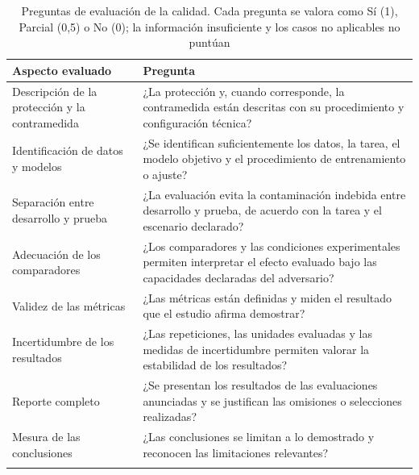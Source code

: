\begin{table}[t]
\caption{Preguntas de evaluación de la calidad. Cada pregunta se valora como Sí (1), Parcial (0,5) o No (0); la información insuficiente y los casos no aplicables no puntúan}\label{tab:calidad}
\footnotesize
\begin{tabularx}{\textwidth}{@{}L{3.6cm}Y{1.0}@{}}
\toprule
Aspecto evaluado & Pregunta \\
\midrule
Descripción de la protección y la contramedida & ¿La protección y, cuando corresponde, la contramedida están descritas con su procedimiento y configuración técnica? \\
Identificación de datos y modelos & ¿Se identifican suficientemente los datos, la tarea, el modelo objetivo y el procedimiento de entrenamiento o ajuste? \\
Separación entre desarrollo y prueba & ¿La evaluación evita la contaminación indebida entre desarrollo y prueba, de acuerdo con la tarea y el escenario declarado? \\
Adecuación de los comparadores & ¿Los comparadores y las condiciones experimentales permiten interpretar el efecto evaluado bajo las capacidades declaradas del adversario? \\
Validez de las métricas & ¿Las métricas están definidas y miden el resultado que el estudio afirma demostrar? \\
Incertidumbre de los resultados & ¿Las repeticiones, las unidades evaluadas y las medidas de incertidumbre permiten valorar la estabilidad de los resultados? \\
Reporte completo & ¿Se presentan los resultados de las evaluaciones anunciadas y se justifican las omisiones o selecciones realizadas? \\
Mesura de las conclusiones & ¿Las conclusiones se limitan a lo demostrado y reconocen las limitaciones relevantes? \\
\botrule
\end{tabularx}
\end{table}
